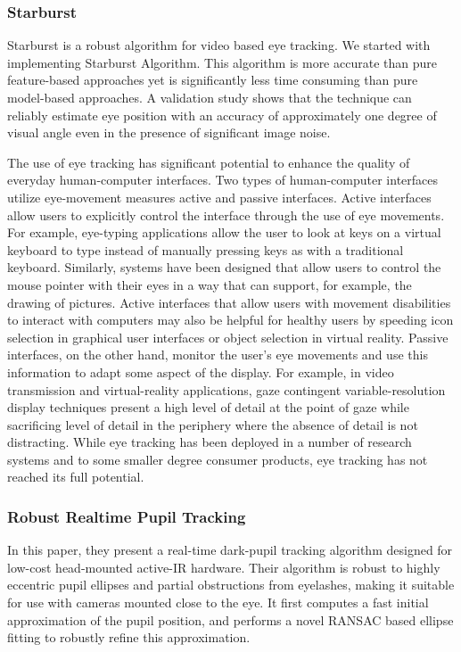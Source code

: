  


\subsubsection{Starburst}
Starburst is a robust algorithm for video based eye tracking. We started with implementing Starburst Algorithm. This algorithm is more accurate than pure feature-based approaches yet is significantly less time consuming than pure model-based approaches. A validation study shows that the technique can reliably estimate eye position with an accuracy of approximately one degree of visual angle even in the presence of significant image noise. \bigskip

The use of eye tracking has significant potential to enhance the quality of everyday human-computer interfaces. Two types of human-computer interfaces utilize eye-movement measures active and passive interfaces. Active interfaces allow users to explicitly control the interface through the use of eye movements. For example, eye-typing applications allow the user to look at keys on a virtual keyboard to type instead of manually pressing keys as with a traditional keyboard. Similarly, systems have been designed that allow users to control the mouse pointer with their eyes in a way that can support, for example, the drawing of pictures. Active interfaces that allow users with movement disabilities to interact with computers may also be helpful for healthy users by speeding icon selection in graphical user interfaces or object selection in virtual reality. Passive interfaces, on the other hand, monitor the user's eye movements and use this information to adapt some aspect of the display. For example, in video transmission and virtual-reality applications, gaze contingent variable-resolution display techniques present a high level of detail at the point of gaze while sacrificing level of detail in the periphery where the absence of detail is not distracting. While eye tracking has been deployed in a number of research systems and to some smaller degree consumer products, eye tracking has not reached its full potential.

\subsubsection{Robust Realtime Pupil Tracking}
In this paper, they present a real-time dark-pupil tracking algorithm designed for low-cost head-mounted active-IR hardware. Their algorithm is robust to highly eccentric pupil ellipses and partial obstructions from eyelashes, making it suitable for use with cameras mounted close to the eye. It first computes a fast initial approximation of the pupil position, and performs a novel RANSAC based ellipse fitting to robustly refine this approximation.


